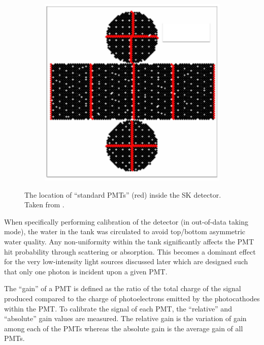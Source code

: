 \begin{figure}[h]
  \begin{subfigure}[t]{0.50\textwidth}
    \includegraphics[width=\textwidth, trim={0mm 0mm 0mm 0mm}, clip,page=1]{Figures/Detectors/StandardPMTs.pdf}
  \end{subfigure}
  \caption{The location of ``standard PMTs'' (red) inside the SK detector. Taken from \cite{Abe_2014_SKCalib}.}
  \label{fig:T2KSKExp_SK_StandardPMTs}
\end{figure}

When specifically performing calibration of the detector (in out-of-data taking mode), the water in the tank was circulated to avoid top/bottom asymmetric water quality. Any non-uniformity within the tank significantly affects the PMT hit probability through scattering or absorption. This becomes a dominant effect for the very low-intensity light sources discussed later which are designed such that only one photon is incident upon a given PMT.

The ``gain'' of a PMT is defined as the ratio of the total charge of the signal produced compared to the charge of photoelectrons emitted by the photocathodes within the PMT. To calibrate the signal of each PMT, the ``relative'' and ``absolute'' gain values are measured. The relative gain is the variation of gain among each of the PMTs whereas the absolute gain is the average gain of all PMTs. 

